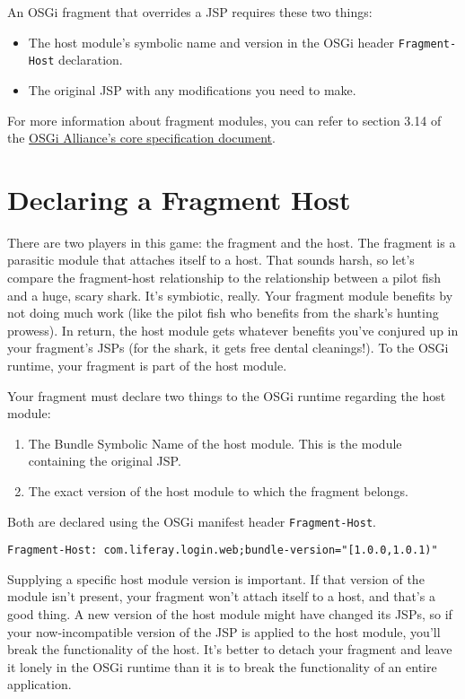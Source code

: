 An OSGi fragment that overrides a JSP requires these two things:

\begin{itemize}
\item
  The host module's symbolic name and version in the OSGi header
  \texttt{Fragment-Host} declaration.
\item
  The original JSP with any modifications you need to make.
\end{itemize}

For more information about fragment modules, you can refer to section
3.14 of the
\href{https://osgi.org/specification/osgi.core/7.0.0/framework.module.html}{OSGi
Alliance's core specification document}.

\section{Declaring a Fragment Host}\label{declaring-a-fragment-host}

There are two players in this game: the fragment and the host. The
fragment is a parasitic module that attaches itself to a host. That
sounds harsh, so let's compare the fragment-host relationship to the
relationship between a pilot fish and a huge, scary shark. It's
symbiotic, really. Your fragment module benefits by not doing much work
(like the pilot fish who benefits from the shark's hunting prowess). In
return, the host module gets whatever benefits you've conjured up in
your fragment's JSPs (for the shark, it gets free dental cleanings!). To
the OSGi runtime, your fragment is part of the host module.

Your fragment must declare two things to the OSGi runtime regarding the
host module:

\begin{enumerate}
\def\labelenumi{\arabic{enumi}.}
\item
  The Bundle Symbolic Name of the host module. This is the module
  containing the original JSP.
\item
  The exact version of the host module to which the fragment belongs.
\end{enumerate}

Both are declared using the OSGi manifest header \texttt{Fragment-Host}.

\begin{verbatim}
Fragment-Host: com.liferay.login.web;bundle-version="[1.0.0,1.0.1)"
\end{verbatim}

Supplying a specific host module version is important. If that version
of the module isn't present, your fragment won't attach itself to a
host, and that's a good thing. A new version of the host module might
have changed its JSPs, so if your now-incompatible version of the JSP is
applied to the host module, you'll break the functionality of the host.
It's better to detach your fragment and leave it lonely in the OSGi
runtime than it is to break the functionality of an entire application.

